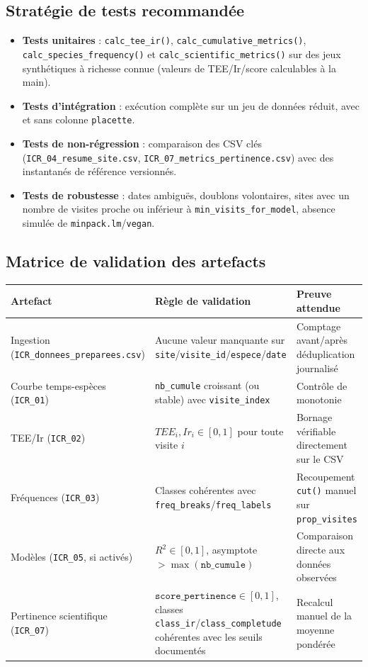 \documentclass[11pt,a4paper]{article}
\begin{document}
\subsection{Stratégie de tests recommandée}
\begin{itemize}[leftmargin=1.2cm]
  \item \textbf{Tests unitaires} : \texttt{calc\_tee\_ir()}, \texttt{calc\_cumulative\_metrics()}, \texttt{calc\_species\_frequency()} et \texttt{calc\_scientific\_metrics()} sur des jeux synthétiques à richesse connue (valeurs de TEE/Ir/score calculables à la main).
  \item \textbf{Tests d'intégration} : exécution complète sur un jeu de données réduit, avec et sans colonne \texttt{placette}.
  \item \textbf{Tests de non-régression} : comparaison des CSV clés (\texttt{ICR\_04\_resume\_site.csv}, \texttt{ICR\_07\_metrics\_pertinence.csv}) avec des instantanés de référence versionnés.
  \item \textbf{Tests de robustesse} : dates ambiguës, doublons volontaires, sites avec un nombre de visites proche ou inférieur à \texttt{min\_visits\_for\_model}, absence simulée de \texttt{minpack.lm}/\texttt{vegan}.
\end{itemize}

\subsection{Matrice de validation des artefacts}
\begin{longtable}{|p{3.5cm}|p{5.2cm}|p{5.6cm}|}
\hline
\textbf{Artefact} & \textbf{Règle de validation} & \textbf{Preuve attendue} \\
\hline
Ingestion (\texttt{ICR\_donnees\_preparees.csv}) & Aucune valeur manquante sur \texttt{site}/\texttt{visite\_id}/\texttt{espece}/\texttt{date} & Comptage avant/après déduplication journalisé \\
\hline
Courbe temps-espèces (\texttt{ICR\_01}) & \texttt{nb\_cumule} croissant (ou stable) avec \texttt{visite\_index} & Contrôle de monotonie \\
\hline
TEE/Ir (\texttt{ICR\_02}) & $TEE_i, Ir_i \in [0,1]$ pour toute visite $i$ & Bornage vérifiable directement sur le CSV \\
\hline
Fréquences (\texttt{ICR\_03}) & Classes cohérentes avec \texttt{freq\_breaks}/\texttt{freq\_labels} & Recoupement \texttt{cut()} manuel sur \texttt{prop\_visites} \\
\hline
Modèles (\texttt{ICR\_05}, si activés) & $R^2 \in [0,1]$, asymptote $> \max(\texttt{nb\_cumule})$ & Comparaison directe aux données observées \\
\hline
Pertinence scientifique (\texttt{ICR\_07}) & $\texttt{score\_pertinence} \in [0,1]$, classes \texttt{class\_ir}/\texttt{class\_completude} cohérentes avec les seuils documentés & Recalcul manuel de la moyenne pondérée \\
\hline
\end{longtable}
\end{document}

